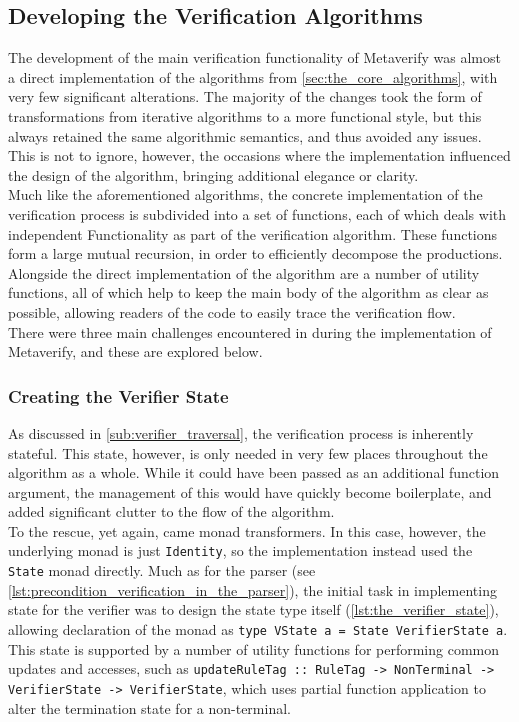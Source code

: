 
\subsection{Developing the Verification Algorithms} %
\label{sub:developing_the_verification_algorithms}
The development of the main verification functionality of Metaverify was almost a direct implementation of the algorithms from \autoref{sec:the_core_algorithms}, with very few significant alterations.
The majority of the changes took the form of transformations from iterative algorithms to a more functional style, but this always retained the same algorithmic semantics, and thus avoided any issues. 
This is not to ignore, however, the occasions where the implementation influenced the design of the algorithm, bringing additional elegance or clarity.\\

Much like the aforementioned algorithms, the concrete implementation of the verification process is subdivided into a set of functions, each of which deals with independent Functionality as part of the verification algorithm.
These functions form a large mutual recursion, in order to efficiently decompose the productions. 
Alongside the direct implementation of the algorithm are a number of utility functions, all of which help to keep the main body of the algorithm as clear as possible, allowing readers of the code to easily trace the verification flow. \\

There were three main challenges encountered in during the implementation of Metaverify, and these are explored below.

\subsubsection{Creating the Verifier State} %
\label{ssub:creating_the_verifier_state}
As discussed in \autoref{sub:verifier_traversal}, the verification process is inherently stateful.
This state, however, is only needed in very few places throughout the algorithm as a whole. 
While it could have been passed as an additional function argument, the management of this would have quickly become boilerplate, and added significant clutter to the flow of the algorithm. \\

To the rescue, yet again, came monad transformers. 
In this case, however, the underlying monad is just \texttt{Identity}, so the implementation instead used the \texttt{State} monad directly.
Much as for the parser (see \autoref{lst:precondition_verification_in_the_parser}), the initial task in implementing state for the verifier was to design the state type itself (\autoref{lst:the_verifier_state}), allowing declaration of the monad as \texttt{type VState a = State VerifierState a}.
This state is supported by a number of utility functions for performing common updates and accesses, such as \texttt{updateRuleTag :: RuleTag -> NonTerminal -> VerifierState -> VerifierState}, which uses partial function application to alter the termination state for a non-terminal. 

